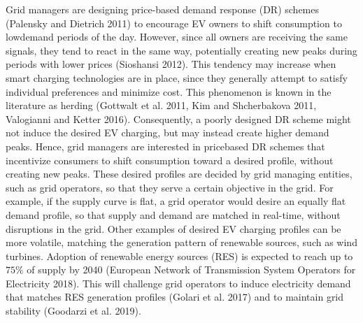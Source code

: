 \documentclass[10pt]{article}
\begin{document}
Grid managers are designing price-based demand response (DR) schemes (Palensky and Dietrich 2011) to encourage EV owners to shift consumption to lowdemand periods of the day. However, since all owners are receiving the same signals, they tend to react in the same way, potentially creating new peaks during periods with lower prices (Sioshansi 2012). This tendency may increase when smart charging technologies are in place, since they generally attempt to satisfy individual preferences and minimize cost. This phenomenon is known in the literature as herding (Gottwalt et al. 2011, Kim and Shcherbakova 2011, Valogianni and Ketter 2016). Consequently, a poorly designed DR scheme might not induce the desired EV charging, but may instead create higher demand peaks. Hence, grid managers are interested in pricebased DR schemes that incentivize consumers to shift consumption toward a desired profile, without creating new peaks. These desired profiles are decided by grid managing entities, such as grid operators, so that they serve a certain objective in the grid. For example, if the supply curve is flat, a grid operator would desire an equally flat demand profile, so that supply and demand are matched in real-time, without disruptions in the grid. Other examples of desired EV charging profiles can be more volatile, matching the generation pattern of renewable sources, such as wind turbines. Adoption of renewable energy sources (RES) is expected to reach up to $75 \%$ of supply by 2040 (European Network of Transmission System Operators for Electricity 2018). This will challenge grid operators to induce electricity demand that matches RES generation profiles (Golari et al. 2017) and to maintain grid stability (Goodarzi et al. 2019).
\end{document}
